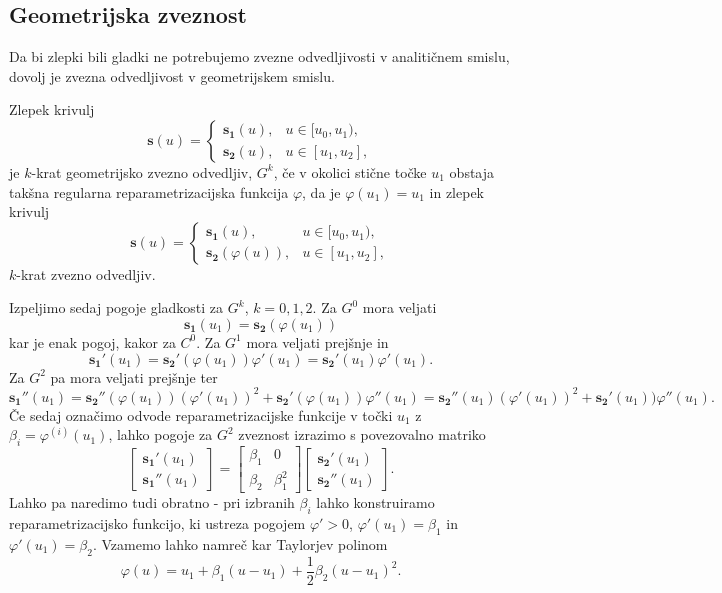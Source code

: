 \documentclass[isrm2, tisk]{fmfdelo}
\begin{document}
    \subsection{Geometrijska zveznost}
    Da bi zlepki bili gladki ne potrebujemo zvezne odvedljivosti v analitičnem smislu, dovolj je zvezna odvedljivost v geometrijskem smislu.
    \begin{definicija}
        \label{def:geometrijska-zveznost}
        Zlepek krivulj \[\mathbf{s}(u) = \begin{cases}
                                             \mathbf{s_1}(u), & u \in [u_0,u_1),  \\
                                             \mathbf{s_2}(u), & u \in [u_1,u_2],
        \end{cases}\] je $k$-krat geometrijsko zvezno odvedljiv, $G^k$, če v okolici stične točke $u_1$ obstaja takšna regularna reparametrizacijska funkcija $\varphi$, da je $\varphi(u_1)=u_1$ in zlepek krivulj
        \[\mathbf{s}(u) = \begin{cases}
                              \mathbf{s_1}(u), & u \in [u_0,u_1),  \\
                              \mathbf{s_2}(\varphi(u)), & u \in [u_1,u_2],
        \end{cases}\]
        $k$-krat zvezno odvedljiv.
    \end{definicija}
    \noindent Izpeljimo sedaj pogoje gladkosti za $G^k$, $k=0,1,2$.
    Za $G^0$ mora veljati \[\mathbf{s_1}(u_1) =  \mathbf{s_2}(\varphi(u_1))\] kar je enak pogoj, kakor za $C^0$.
    Za $G^1$ mora veljati prejšnje in \[ \mathbf{s_1'}(u_1) = \mathbf{s_2'}(\varphi(u_1))\varphi'(u_1) = \mathbf{s_2'}(u_1)\varphi'(u_1).\]
    Za $G^2$ pa mora veljati prejšnje ter \[\mathbf{s_1''}(u_1) = \mathbf{s_2''}(\varphi(u_1))(\varphi'(u_1))^2 +  \mathbf{s_2'}(\varphi(u_1))\varphi''(u_1) =\mathbf{s_2''}(u_1)(\varphi'(u_1))^2 +  \mathbf{s_2'}(u_1))\varphi''(u_1).\]
    Če sedaj označimo odvode reparametrizacijske funkcije v točki $u_1$ z $\beta_i = \varphi^{(i)}(u_1)$, lahko pogoje za $G^2$ zveznost izrazimo s povezovalno matriko
    \[
        \begin{bmatrix}
            \mathbf{s_1'}(u_1) \\
            \mathbf{s_1''}(u_1)
        \end{bmatrix}
        =
        \begin{bmatrix}
            \beta_1 & 0         \\
            \beta_2 & \beta_1^2
        \end{bmatrix}  \begin{bmatrix}
                           \mathbf{s_2'}(u_1) \\
                           \mathbf{s_2''}(u_1)
        \end{bmatrix}.\]
    Lahko pa naredimo tudi obratno - pri izbranih $\beta_i$ lahko konstruiramo reparametrizacijsko funkcijo, ki ustreza pogojem $\varphi'>0$,  $\varphi'(u_1)=\beta_1$ in $\varphi'(u_1)=\beta_2$. Vzamemo lahko namreč kar Taylorjev polinom
    \[\varphi(u) = u_1 + \beta_1(u-u_1) + \frac{1}{2}\beta_2(u-u_1)^2.\]
\end{document}
